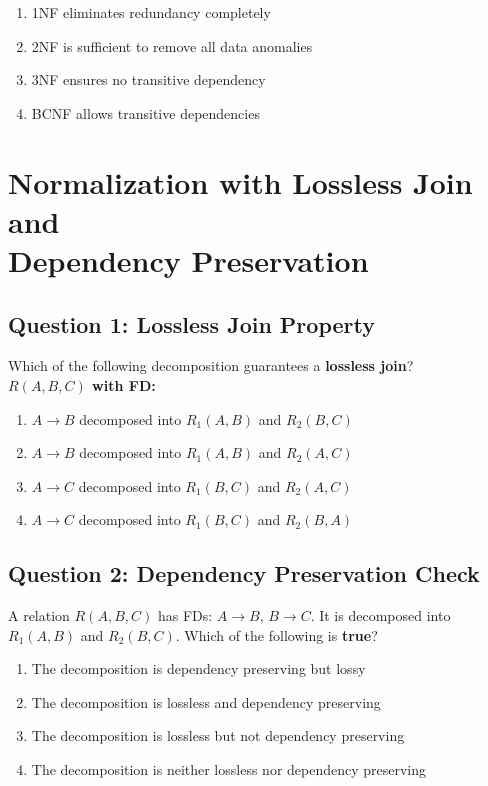\begin{enumerate}[label=(\alph*)]
    \item 1NF eliminates redundancy completely
    \item 2NF is sufficient to remove all data anomalies
    \item 3NF ensures no transitive dependency
    \item BCNF allows transitive dependencies
\end{enumerate}

\section[Normalization with Lossless Join and Dependency Preservation]
{Normalization with Lossless Join and\\ Dependency Preservation}

\subsection*{Question 1: Lossless Join Property}
Which of the following decomposition guarantees a \textbf{lossless join}?\\
\textbf{$R(A, B, C)$ with FD:}

\begin{enumerate}[label=(\alph*)]
    \item $A \rightarrow B$ decomposed into $R_1(A, B)$ and $R_2(B, C)$
    \item $A \rightarrow B$ decomposed into $R_1(A, B)$ and $R_2(A, C)$
    \item $A \rightarrow C$ decomposed into $R_1(B, C)$ and $R_2(A, C)$
    \item $A \rightarrow C$ decomposed into $R_1(B, C)$ and $R_2(B, A)$
\end{enumerate}

\vspace{1em}

\subsection*{Question 2: Dependency Preservation Check}
A relation $R(A, B, C)$ has FDs: $A \rightarrow B$, $B \rightarrow C$. It is decomposed into $R_1(A, B)$ and $R_2(B, C)$. Which of the following is \textbf{true}?

\begin{enumerate}[label=(\alph*)]
    \item The decomposition is dependency preserving but lossy
    \item The decomposition is lossless and dependency preserving
    \item The decomposition is lossless but not dependency preserving
    \item The decomposition is neither lossless nor dependency preserving
\end{enumerate}

